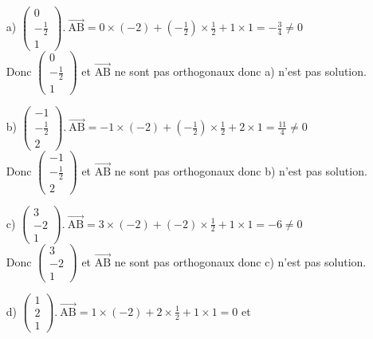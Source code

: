 \documentclass[a4paper, 12pt]{article}
\begin{document}
\begin{itemize}
    \item[a)] $\begin{pmatrix} 0 \\ -\frac{1}{2} \\ 1 \end{pmatrix} .\ \overrightarrow{\text{AB}} = 0 \times (-2) + (-\frac{1}{2}) \times \frac{1}{2} + 1 \times 1 = -\frac{3}{4} \neq 0$
        \\ Donc $\begin{pmatrix} 0 \\ -\frac{1}{2} \\ 1 \end{pmatrix}$  et $\overrightarrow{\text{AB}}$ ne sont pas orthogonaux donc a) n'est pas solution. \vspace{2mm}
    \item[b)] $\begin{pmatrix} -1 \\ -\frac{1}{2} \\ 2 \end{pmatrix} .\ \overrightarrow{\text{AB}} = -1 \times (-2) + (-\frac{1}{2}) \times \frac{1}{2} + 2 \times 1 = \frac{11}{4} \neq 0$
        \\ Donc $\begin{pmatrix} -1 \\ -\frac{1}{2} \\ 2 \end{pmatrix}$  et $\overrightarrow{\text{AB}}$ ne sont pas orthogonaux donc b) n'est pas solution. \vspace{2mm}
    \item[c)] $\begin{pmatrix} 3 \\ -2 \\ 1 \end{pmatrix} .\ \overrightarrow{\text{AB}} = 3 \times (-2) + (-2) \times \frac{1}{2} + 1 \times 1 = -6 \neq 0$
        \\ Donc $\begin{pmatrix} 3 \\ -2 \\ 1 \end{pmatrix}$  et $\overrightarrow{\text{AB}}$ ne sont pas orthogonaux donc c) n'est pas solution. \vspace{2mm}
    \item[d)] $\begin{pmatrix} 1 \\ 2 \\ 1 \end{pmatrix} .\ \overrightarrow{\text{AB}} = 1 \times (-2) + 2 \times \frac{1}{2} + 1 \times 1 = 0$ et

\end{itemize}
\end{document}
